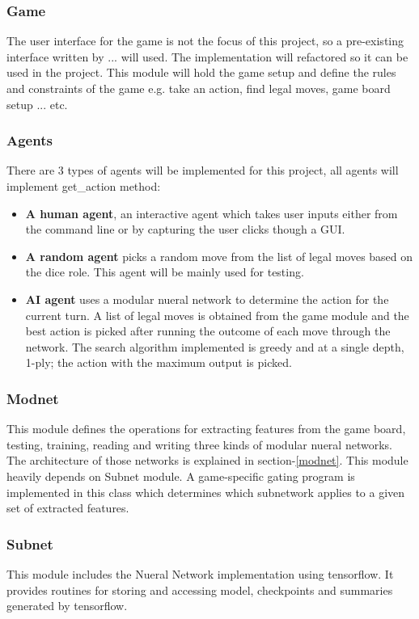 \documentclass[12pt,a4paper]{article}
\begin{document}
\subsubsection{Game}
The user interface for the game is not the focus of this project, so a pre-existing interface written by ... will used. The implementation will refactored so it can be used in the project. This module will hold the game setup and define the rules and constraints of the game e.g. take an action, find legal moves, game board setup ... etc.

\subsubsection{Agents}
There are 3 types of agents will be implemented for this project, all agents will implement get\_action method: 
\begin{itemize}
    \item \textbf{A human agent}, an interactive agent which takes user inputs either from the command line or by capturing the user clicks though a GUI.
    \item \textbf{A random agent} picks a random move from the list of legal moves based on the dice role. This agent will be mainly used for testing.
    \item \textbf{AI agent} uses a modular nueral network to determine the action for the current turn. A list of legal moves is obtained from the game module and the best action is picked after running the outcome of each move through the network. The search algorithm implemented is greedy and at a single depth, 1-ply; the action with the maximum output is picked.
\end{itemize}

\subsubsection{Modnet}
This module defines the operations for extracting features from the game board, testing, training, reading and writing three kinds of modular nueral networks. The architecture of those networks is explained in section-\ref{modnet}. This module heavily depends on Subnet module. A game-specific gating program is implemented in this class which determines which subnetwork applies to a given set of extracted features.

\subsubsection{Subnet}
This module includes the Nueral Network implementation using tensorflow. It provides routines for storing and accessing model, checkpoints and summaries generated by tensorflow.  
\end{document}
